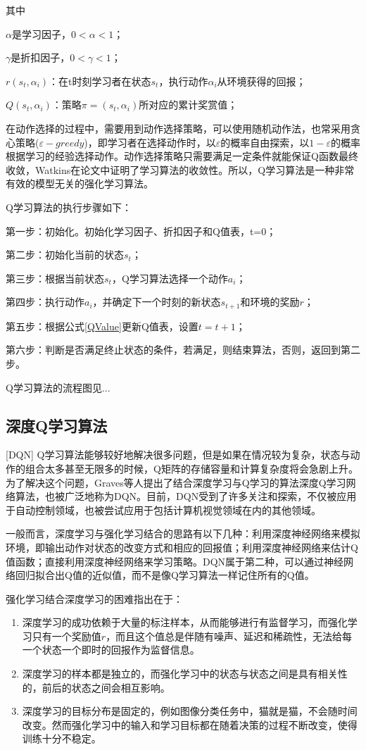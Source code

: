 其中

$\alpha$是学习因子，$0<\alpha <1$；

$\gamma$是折扣因子，$0<\gamma <1$；

$r(s_t,\alpha_i)$：在t时刻学习者在状态$s_t$，执行动作$\alpha_i$从环境获得的回报；

$Q(s_t,\alpha_i)$：策略$\pi=(s_t,\alpha_i)$所对应的累计奖赏值；

在动作选择的过程中，需要用到动作选择策略，可以使用随机动作法，也常采用贪心策略($\varepsilon-greedy$)，即学习者在选择动作时，以$\varepsilon$的概率自由探索，以$1-\varepsilon$的概率根据学习的经验选择动作。动作选择策略只需要满足一定条件就能保证Q函数最终收敛，Watkins在论文\cite{QLearning3}中证明了学习算法的收敛性。所以，Q学习算法是一种非常有效的模型无关的强化学习算法。

Q学习算法的执行步骤如下：

第一步：初始化。初始化学习因子、折扣因子和Q值表，t=0；

第二步：初始化当前的状态$s_t$；

第三步：根据当前状态$s_t$，Q学习算法选择一个动作$a_i$；

第四步：执行动作$a_i$，并确定下一个时刻的新状态$s_{t+1}$和环境的奖励$r$；

第五步：根据公式\ref{QValue}更新Q值表，设置$t = t+1$；

第六步：判断是否满足终止状态的条件，若满足，则结束算法，否则，返回到第二步。

Q学习算法的流程图见...

\subsection{深度Q学习算法}[DQN]
Q学习算法能够较好地解决很多问题，但是如果在情况较为复杂，状态与动作的组合太多甚至无限多的时候，Q矩阵的存储容量和计算复杂度将会急剧上升。为了解决这个问题，Graves等人提出了结合深度学习与Q学习的算法深度Q学习网络算法\cite{DQNNature}，也被广泛地称为DQN。目前，DQN受到了许多关注和探索，不仅被应用于自动控制领域，也被尝试应用于包括计算机视觉领域在内的其他领域。

一般而言，深度学习与强化学习结合的思路有以下几种：利用深度神经网络来模拟环境，即输出动作对状态的改变方式和相应的回报值；利用深度神经网络来估计Q值函数；直接利用深度神经网络来学习策略。DQN属于第二种，可以通过神经网络回归拟合出Q值的近似值，而不是像Q学习算法一样记住所有的Q值。

强化学习结合深度学习的困难指出在于：
\begin{enumerate}    
    \item 深度学习的成功依赖于大量的标注样本，从而能够进行有监督学习，而强化学习只有一个奖励值$r$，而且这个值总是伴随有噪声、延迟和稀疏性，无法给每一个状态一个即时的回报作为监督信息。
    \item 深度学习的样本都是独立的，而强化学习中的状态与状态之间是具有相关性的，前后的状态之间会相互影响。
    \item 深度学习的目标分布是固定的，例如图像分类任务中，猫就是猫，不会随时间改变。然而强化学习中的输入和学习目标都在随着决策的过程不断改变，使得训练十分不稳定。
\end{enumerate}

